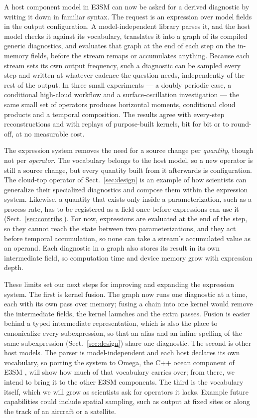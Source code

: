 \documentclass[gmd, manuscript]{copernicus}
\begin{document}
\label{sec:conclusions}

A host component model in E3SM can now be asked for a derived diagnostic by writing it down in familiar syntax. The request is an expression over model fields in the output configuration. A model-independent library parses it, and the host model checks it against its vocabulary, translates it into a graph of its compiled generic diagnostics, and evaluates that graph at the end of each step on the in-memory fields, before the stream remaps or accumulates anything. Because each stream sets its own output frequency, such a diagnostic can be sampled every step and written at whatever cadence the question needs, independently of the rest of the output. In three small experiments --- a doubly periodic case, a conditional high-cloud workflow and a surface-oscillation investigation --- the same small set of operators produces horizontal moments, conditional cloud products and a temporal composition. The results agree with every-step reconstructions and with replays of purpose-built kernels, bit for bit or to round-off, at no measurable cost.

The expression system removes the need for a source change per \emph{quantity}, though not per \emph{operator}. The vocabulary belongs to the host model, so a new operator is still a source change, but every quantity built from it afterwards is configuration. The cloud-top operator of Sect.~\ref{sec:design} is an example of how scientists can generalize their specialized diagnostics and compose them within the expression system. Likewise, a quantity that exists only inside a parameterization, such as a process rate, has to be registered as a field once before expressions can use it (Sect.~\ref{sec:contribs}). For now, expressions are evaluated at the end of the step, so they cannot reach the state between two parameterizations, and they act before temporal accumulation, so none can take a stream's accumulated value as an operand. Each diagnostic in a graph also stores its result in its own intermediate field, so computation time and device memory grow with expression depth.

These limits set our next steps for improving and expanding the expression system. The first is kernel fusion. The graph now runs one diagnostic at a time, each with its own pass over memory; fusing a chain into one kernel would remove the intermediate fields, the kernel launches and the extra passes. Fusion is easier behind a typed intermediate representation, which is also the place to canonicalize every subexpression, so that an alias and an inline spelling of the same subexpression (Sect.~\ref{sec:design}) share one diagnostic. The second is other host models. The parser is model-independent and each host declares its own vocabulary, so porting the system to Omega, the C++ ocean component of E3SM \citep{petersen_ocean_2026}, will show how much of that vocabulary carries over; from there, we intend to bring it to the other E3SM components. The third is the vocabulary itself, which we will grow as scientists ask for operators it lacks. Example future capabilities could include spatial sampling, such as output at fixed sites or along the track of an aircraft or a satellite.
\end{document}
